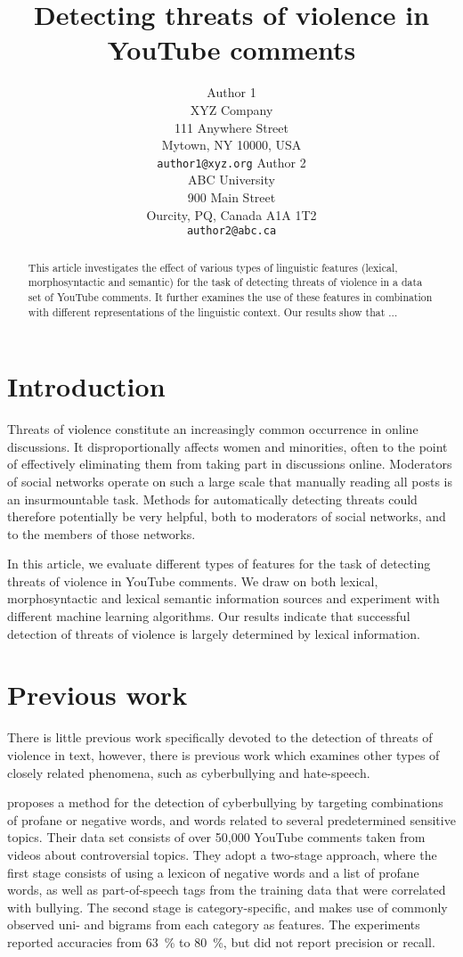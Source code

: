 \documentclass[11pt,letterpaper]{article}
\title{Detecting threats of violence in YouTube comments}
\author{Author 1\\
	    XYZ Company\\
	    111 Anywhere Street\\
	    Mytown, NY 10000, USA\\
	    {\tt author1@xyz.org}
	  \And
	Author 2\\
  	ABC University\\
  	900 Main Street\\
  	Ourcity, PQ, Canada A1A 1T2\\
  {\tt author2@abc.ca}}
\date{}
\begin{document}
\maketitle

\begin{abstract}
This article investigates the effect of various types of linguistic
features (lexical, morphosyntactic and semantic) for the task of
detecting threats of violence in a data set of YouTube comments. It
further examines the use of these features in combination with
different representations of the linguistic context. Our results show that ...
\end{abstract}

\section{Introduction}
\label{sec:intro}
Threats of violence constitute an increasingly common occurrence in online
discussions. It disproportionally affects women and minorities, often
to the point of effectively eliminating them from taking part in
discussions online. Moderators of social networks operate on such a
large scale that manually reading all posts is an insurmountable
task. Methods for automatically detecting threats could therefore
potentially be very helpful, both to moderators of social networks,
and to the members of those networks.

In this article, we evaluate different types of features for the task
of detecting threats of violence in YouTube comments. We draw on both
lexical, morphosyntactic and lexical semantic information sources and
experiment with different machine learning algorithms. Our results
indicate that successful detection of threats of violence is largely
determined by lexical information.

\section{Previous work}
\label{sec:prev}
There is little previous work specifically devoted to the detection of
threats of violence in text, however, there is previous work which
examines other types of closely related phenomena, such as
cyberbullying and hate-speech.

 proposes a method for the detection of
cyberbullying by targeting combinations of profane or negative words,
and words related to several predetermined sensitive topics. Their
data set consists of over 50,000 YouTube comments taken from videos
about controversial topics. They adopt a two-stage approach, where the
first stage consists of using a lexicon of negative words and a list
of profane words, as well as part-of-speech tags from the training
data that were correlated with bullying. The second stage is
category-specific, and makes use of commonly observed uni- and bigrams
from each category as features. The experiments reported accuracies
from 63~\% to 80~\%, but did not report precision or recall.
\end{document}
